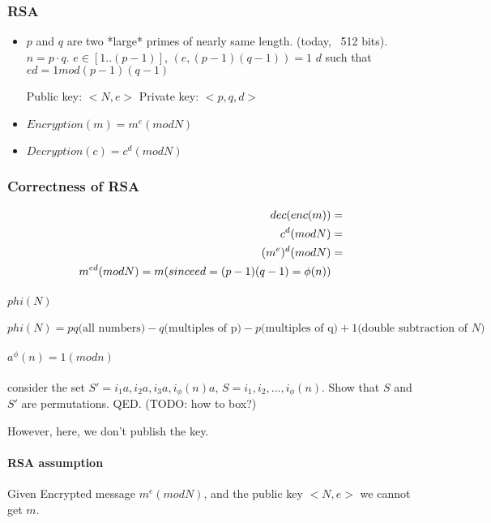 \subsubsection{RSA}
\begin{itemize}
\item $p$ and $q$ are two *large* primes of nearly same length. (today, ~512 bits).
  $n = p \cdot q$. $e \in [1..(p-1)]$, $(e, (p - 1)(q - 1)) = 1$
  $d$ such that $ed = 1 mod (p - 1)(q - 1)$

  Public key: $<N, e>$
  Private key: $<p, q, d>$

\item $Encryption(m) = m^e (mod N)$
\item $Decryption(c) = c^d (mod N)$
\end{itemize}

\subsubsection{Correctness of RSA}
\begin{align}
  dec(enc(m)) &= \\
  c^d(mod N) &= \\
  (m^e)^d (mod N) &= \\
  m^{ed} (mod N)
  = m \text(since ed = (p - 1)(q - 1) = \phi(n))
\end{align}

\paragraph{$phi(N)$}
$phi(N) = pq \text{(all numbers)} - q \text{(multiples of p)} - p \text{(multiples of q)} + 1 \text{(double subtraction of $N$)}$

\paragraph{$a^\phi(n) = 1 (mod n)$}
consider the set $S' = {i_1 a , i_2 a, i_3 a, i_\phi(n) a}$, $S = {i_1, i_2, ..., i_\phi(n)}$.
Show that $S$ and $S'$ are permutations.
QED. (TODO: how to box?)


However, here, we don't publish the key.

\paragraph{RSA assumption}

Given Encrypted message $m^e (mod N)$, and the public key $<N, e>$ we cannot get $m$.



